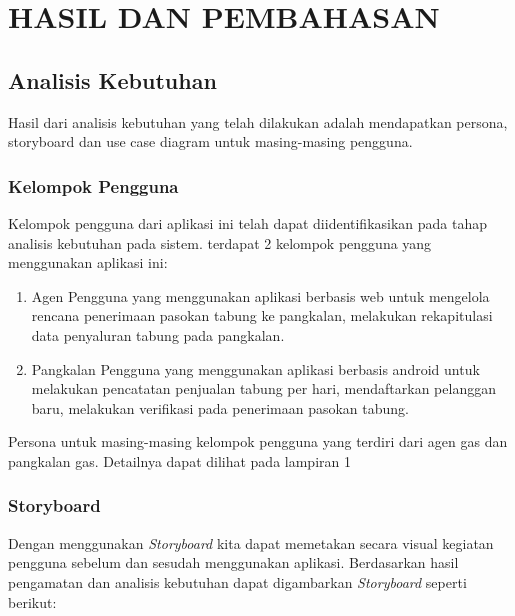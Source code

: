 
\chapter{HASIL DAN PEMBAHASAN}
	\section{Analisis Kebutuhan}
	
	Hasil dari analisis kebutuhan yang telah dilakukan adalah mendapatkan persona, storyboard dan use case diagram untuk masing-masing pengguna.
	
	\subsection{Kelompok Pengguna}
	Kelompok pengguna dari aplikasi ini telah dapat diidentifikasikan pada tahap analisis kebutuhan pada sistem. terdapat 2 kelompok pengguna yang menggunakan aplikasi ini:
		 \begin{enumerate}[1.]
		 	\item Agen
		 		\newline Pengguna yang menggunakan aplikasi berbasis web untuk mengelola rencana penerimaan pasokan tabung ke pangkalan, melakukan rekapitulasi data penyaluran tabung pada pangkalan.
		 	\item Pangkalan
		 		\newline Pengguna yang menggunakan aplikasi berbasis android untuk melakukan pencatatan penjualan tabung per hari, mendaftarkan pelanggan baru, melakukan verifikasi pada penerimaan pasokan tabung.
		 \end{enumerate}
	 
	 Persona untuk masing-masing kelompok pengguna yang terdiri dari agen gas dan pangkalan gas. Detailnya dapat dilihat pada lampiran 1
	
	\subsection{Storyboard}
	Dengan menggunakan \textit{Storyboard} kita dapat memetakan secara visual kegiatan pengguna sebelum dan sesudah menggunakan aplikasi. Berdasarkan hasil pengamatan dan analisis kebutuhan dapat digambarkan \textit{Storyboard} seperti berikut:
	

